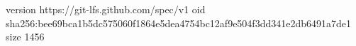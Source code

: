 version https://git-lfs.github.com/spec/v1
oid sha256:bee69bca1b5dc575060f1864e5dea4754bc12af9e504f3dd341e2db6491a7de1
size 1456
